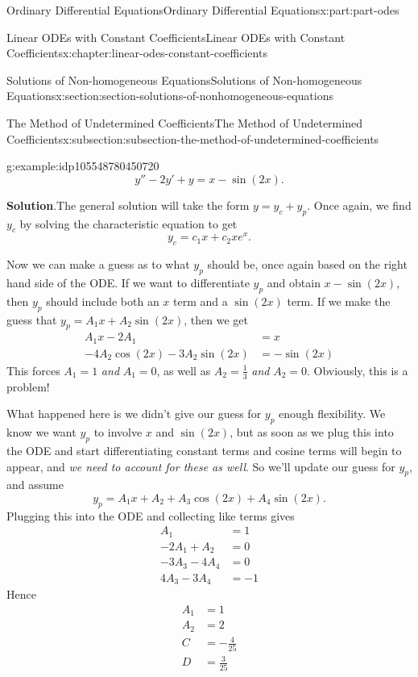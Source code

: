 \documentclass[oneside,10pt,]{book}
\newcommand{\blocktitlefont}{\relax}
\numberwithin{equation}{part}
\newcommand{\amp}{&}
\begin{document}
\begin{partptx}{Ordinary Differential Equations}{}{Ordinary Differential Equations}{}{}{x:part:part-odes}
\begin{chapterptx}{Linear ODEs with Constant Coefficients}{}{Linear ODEs with Constant Coefficients}{}{}{x:chapter:linear-odes-constant-coefficients}
\begin{sectionptx}{Solutions of Non-homogeneous Equations}{}{Solutions of Non-homogeneous Equations}{}{}{x:section:section-solutions-of-nonhomogeneous-equations}
\begin{subsectionptx}{The Method of Undetermined Coefficients}{}{The Method of Undetermined Coefficients}{}{}{x:subsection:subsection-the-method-of-undetermined-coefficients}
\begin{example}{}{g:example:idp105548780450720}
\begin{equation*}
y'' - 2y' + y = x - \sin(2x).
\end{equation*}
%
\par\smallskip%
\noindent\textbf{\blocktitlefont Solution}.\hypertarget{g:solution:idp105548780451616}{}\quad{}The general solution will take the form \(y = y_{c} + y_{p}\). Once again, we find \(y_{c}\) by solving the characteristic equation to get%
\begin{equation*}
y_{c} = c_{1}x + c_{2}xe^{x}.
\end{equation*}
%
\par
Now we can make a guess as to what \(y_{p}\) should be, once again based on the right hand side of the ODE. If we want to differentiate \(y_{p}\) and obtain \(x - \sin(2x)\), then \(y_{p}\) should include both an \(x\) term and a \(\sin(2x)\) term. If we make the guess that \(y_{p} = A_{1}x + A_{2}\sin(2x)\), then we get%
\begin{align*}
A_{1}x - 2A_{1} \amp = x \\
-4A_{2}\cos(2x) - 3A_{2}\sin(2x) \amp = -\sin(2x) 
\end{align*}
This forces \(A_{1} = 1\) \emph{and} \(A_{1} = 0\), as well as \(A_{2} = \frac{1}{3}\) \emph{and} \(A_{2} = 0\). Obviously, this is a problem!%
\par
What happened here is we didn't give our guess for \(y_{p}\) enough flexibility. We know we want \(y_{p}\) to involve \(x\) and \(\sin(2x)\), but as soon as we plug this into the ODE and start differentiating constant terms and cosine terms will begin to appear, and \emph{we need to account for these as well}. So we'll update our guess for \(y_{p}\), and assume%
\begin{equation*}
y_{p} = A_{1}x + A_{2} + A_{3}\cos(2x) + A_{4}\sin(2x).
\end{equation*}
Plugging this into the ODE and collecting like terms gives%
\begin{align*}
A_{1} \amp = 1\\
-2A_{1} + A_{2} \amp = 0\\
-3A_{3} - 4A_{4} \amp = 0\\
4A_{3} - 3A_{4} \amp = -1
\end{align*}
Hence%
\begin{align*}
A_{1} \amp = 1 \\
A_{2} \amp = 2 \\
C \amp = -\frac{4}{25} \\
D \amp = \frac{3}{25} 
\end{align*}

\end{example}
\end{subsectionptx}
\end{sectionptx}
\end{chapterptx}
\end{partptx}
\end{document}

